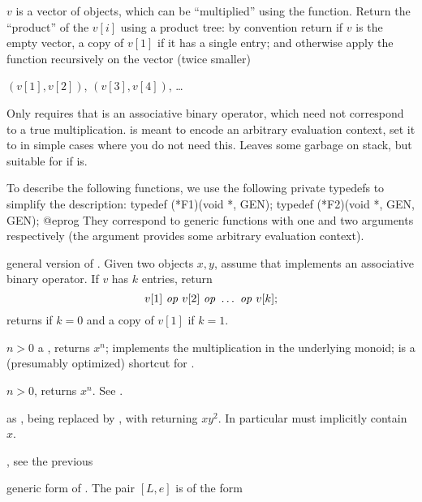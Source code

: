  $v$ is a vector of
objects, which can be ``multiplied'' using the  function. Return
the ``product'' of the $v[i]$ using a product tree: by convention
return  if $v$ is the empty vector, a copy of $v[1]$ if it has a
single entry; and otherwise apply the function recursively on the vector
(twice smaller)

$(v[1],v[2])$, $(v[3],v[4])$, \dots

\noindent Only requires that  is an associative binary operator,
which need not correspond to a true multiplication.  is meant to encode
an arbitrary evaluation context, set it to  in simple cases where you
do not need this. Leaves some garbage on stack, but suitable for
 if  is.

To describe the following functions, we use the following private typedefs
to simplify the description:
\bprog
  typedef (*F1)(void *, GEN);
  typedef (*F2)(void *, GEN, GEN);
@eprog
\noindent They correspond to generic functions with one and two arguments
respectively (the  argument provides some arbitrary evaluation
context).

general version of . Given two objects
$x,y$, assume that  implements an associative binary
operator. If $v$ has $k$ entries, return
$$v[1]~\hbox{\it op\/}~v[2]~\hbox{\it op\/}~\ldots ~\hbox{\it op\/}~v[k];$$
returns  if $k = 0$ and a copy of $v[1]$ if $k = 1$.

 $n > 0$ a
, returns $x^n$;  implements the multiplication
in the underlying monoid;  is a (presumably optimized) shortcut for
.

 $n > 0$,
returns $x^n$. See .

 as
,  being replaced by , with  returning $xy^2$. In particular  must implicitly contain $x$.

, see
the previous 

 generic form
of . The pair $[L,e]$ is of the form

